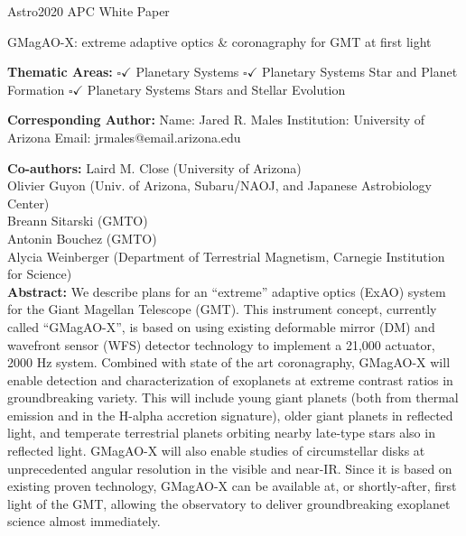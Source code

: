 \documentclass[12pt,preprint]{aastex}
\begin{document}
\thispagestyle{empty}

\raggedright
\huge
Astro2020 APC White Paper \linebreak

GMagAO-X: extreme adaptive optics \& coronagraphy for GMT at first light \linebreak
\normalsize

\noindent \textbf{Thematic Areas:} \linebreak
\hspace*{60pt} $\square$\hspace{-0.11in}$\checkmark$ Planetary Systems \linebreak
\hspace*{60pt} $\square$\hspace{-0.11in}$\checkmark$ Planetary Systems Star and Planet Formation \linebreak
\hspace*{60pt}  $\square$\hspace{-0.11in}$\checkmark$ Planetary Systems  Stars and Stellar Evolution \linebreak
  
\textbf{Corresponding Author:}
Name: Jared R. Males \linebreak
Institution:  University of Arizona \linebreak
Email: jrmales@email.arizona.edu \linebreak
 
\textbf{Co-authors:} 
  \linebreak
Laird M. Close (University of Arizona) \\
Olivier Guyon (Univ. of Arizona, Subaru/NAOJ, and Japanese Astrobiology Center)\\
Breann Sitarski (GMTO)\\
Antonin Bouchez (GMTO)\\
Alycia Weinberger (Department of Terrestrial Magnetism, Carnegie Institution for Science)\\

\vspace{.2in}
\textbf{Abstract:} We describe plans for an ``extreme'' adaptive optics (ExAO) system for the Giant Magellan Telescope (GMT).  This instrument concept, currently called ``GMagAO-X'', is based on using existing deformable mirror (DM) and wavefront sensor (WFS) detector technology to implement a 21,000 actuator, 2000 Hz system.  Combined with state of the art coronagraphy, GMagAO-X will enable detection and characterization of exoplanets at extreme contrast ratios in groundbreaking variety.  This will include young giant planets (both from thermal emission and in the H-alpha accretion signature), older giant planets in reflected light, and temperate terrestrial planets orbiting nearby late-type stars also in reflected light.  GMagAO-X will also enable studies of circumstellar disks at unprecedented angular resolution in the visible and near-IR.  Since it is based on existing proven technology, GMagAO-X can be available at, or shortly-after, first light of the GMT, allowing the observatory to deliver groundbreaking exoplanet science almost immediately.  
\clearpage
\setcounter{page}{1}
\end{document}
